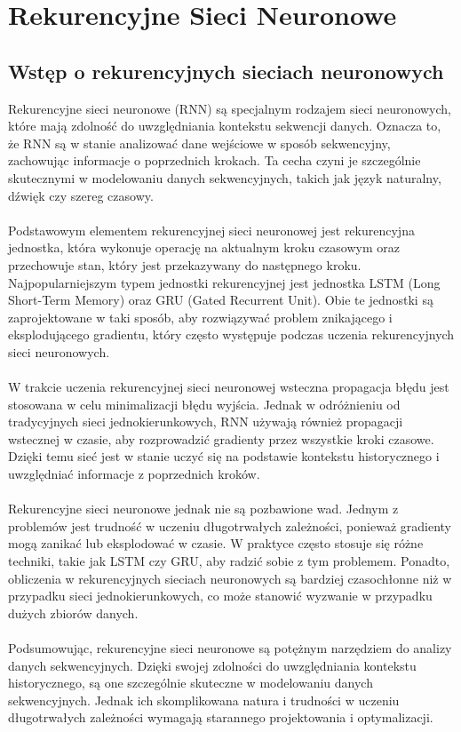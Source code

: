 \documentclass{article}
\begin{document}
\section{Rekurencyjne Sieci Neuronowe}
    \subsection{Wstęp o rekurencyjnych sieciach neuronowych}
    Rekurencyjne sieci neuronowe (RNN) są specjalnym rodzajem sieci neuronowych, które mają zdolność do uwzględniania kontekstu sekwencji danych. Oznacza to, że RNN są w stanie analizować dane wejściowe w sposób sekwencyjny, zachowując informacje o poprzednich krokach. Ta cecha czyni je szczególnie skutecznymi w modelowaniu danych sekwencyjnych, takich jak język naturalny, dźwięk czy szereg czasowy.\\\\
Podstawowym elementem rekurencyjnej sieci neuronowej jest rekurencyjna jednostka, która wykonuje operację na aktualnym kroku czasowym oraz przechowuje stan, który jest przekazywany do następnego kroku. Najpopularniejszym typem jednostki rekurencyjnej jest jednostka LSTM (Long Short-Term Memory) oraz GRU (Gated Recurrent Unit). Obie te jednostki są zaprojektowane w taki sposób, aby rozwiązywać problem znikającego i eksplodującego gradientu, który często występuje podczas uczenia rekurencyjnych sieci neuronowych.\\\\
W trakcie uczenia rekurencyjnej sieci neuronowej wsteczna propagacja błędu jest stosowana w celu minimalizacji błędu wyjścia. Jednak w odróżnieniu od tradycyjnych sieci jednokierunkowych, RNN używają również propagacji wstecznej w czasie, aby rozprowadzić gradienty przez wszystkie kroki czasowe. Dzięki temu sieć jest w stanie uczyć się na podstawie kontekstu historycznego i uwzględniać informacje z poprzednich kroków.\\\\
Rekurencyjne sieci neuronowe jednak nie są pozbawione wad. Jednym z problemów jest trudność w uczeniu długotrwałych zależności, ponieważ gradienty mogą zanikać lub eksplodować w czasie. W praktyce często stosuje się różne techniki, takie jak LSTM czy GRU, aby radzić sobie z tym problemem. Ponadto, obliczenia w rekurencyjnych sieciach neuronowych są bardziej czasochłonne niż w przypadku sieci jednokierunkowych, co może stanowić wyzwanie w przypadku dużych zbiorów danych.\\\\
Podsumowując, rekurencyjne sieci neuronowe są potężnym narzędziem do analizy danych sekwencyjnych. Dzięki swojej zdolności do uwzględniania kontekstu historycznego, są one szczególnie skuteczne w modelowaniu danych sekwencyjnych. Jednak ich skomplikowana natura i trudności w uczeniu długotrwałych zależności wymagają starannego projektowania i optymalizacji.
\end{document}
